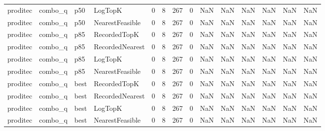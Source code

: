 \begin{tabular}{llllrrrrrrrrrr}
proditec &              combo\_q &    p50 &         LogTopK &           0 &          8 &            267 &                   0 &            NaN &             NaN &                       NaN &            NaN &                    NaN &                     NaN \\
proditec &              combo\_q &    p50 & NearestFeasible &           0 &          8 &            267 &                   0 &            NaN &             NaN &                       NaN &            NaN &                    NaN &                     NaN \\
proditec &              combo\_q &    p85 &    RecordedTopK &           0 &          8 &            267 &                   0 &            NaN &             NaN &                       NaN &            NaN &                    NaN &                     NaN \\
proditec &              combo\_q &    p85 & RecordedNearest &           0 &          8 &            267 &                   0 &            NaN &             NaN &                       NaN &            NaN &                    NaN &                     NaN \\
proditec &              combo\_q &    p85 &         LogTopK &           0 &          8 &            267 &                   0 &            NaN &             NaN &                       NaN &            NaN &                    NaN &                     NaN \\
proditec &              combo\_q &    p85 & NearestFeasible &           0 &          8 &            267 &                   0 &            NaN &             NaN &                       NaN &            NaN &                    NaN &                     NaN \\
proditec &              combo\_q &   best &    RecordedTopK &           0 &          8 &            267 &                   0 &            NaN &             NaN &                       NaN &            NaN &                    NaN &                     NaN \\
proditec &              combo\_q &   best & RecordedNearest &           0 &          8 &            267 &                   0 &            NaN &             NaN &                       NaN &            NaN &                    NaN &                     NaN \\
proditec &              combo\_q &   best &         LogTopK &           0 &          8 &            267 &                   0 &            NaN &             NaN &                       NaN &            NaN &                    NaN &                     NaN \\
proditec &              combo\_q &   best & NearestFeasible &           0 &          8 &            267 &                   0 &            NaN &             NaN &                       NaN &            NaN &                    NaN &                     NaN \\
\bottomrule
\end{tabular}
